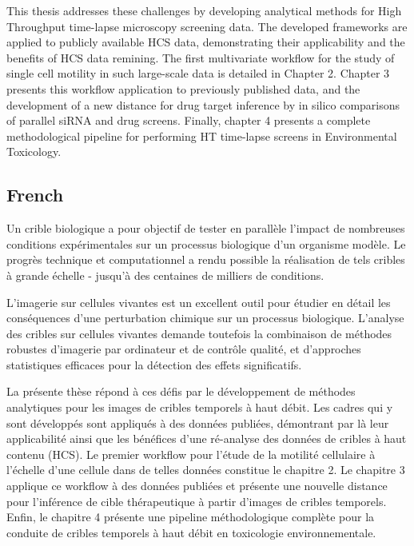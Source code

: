 \documentclass[12pt]{article}
\begin{document}
This thesis addresses these challenges by developing analytical methods for High Throughput time-lapse microscopy screening data. The developed frameworks are applied to publicly available HCS data, demonstrating their applicability and the benefits of HCS data remining. %
The first multivariate workflow for the study of single cell motility in such large-scale data is detailed in Chapter 2. Chapter 3 presents this workflow application to previously published data, and the development of a new distance for drug target inference by in silico comparisons of parallel siRNA and drug screens. Finally, chapter 4 presents a complete methodological pipeline for performing HT time-lapse screens in Environmental Toxicology.%
\subsection{French}
Un crible biologique a pour objectif de tester en parallèle l'impact de nombreuses conditions expérimentales sur un processus biologique d'un organisme modèle. Le progrès technique et computationnel a rendu possible la réalisation de tels cribles à grande échelle - jusqu'à des centaines de milliers de conditions.

L'imagerie sur cellules vivantes est un excellent outil pour étudier en détail les conséquences d'une perturbation chimique sur un processus biologique. L'analyse des cribles sur cellules vivantes demande toutefois la combinaison de méthodes robustes d'imagerie par ordinateur et de contr\^ole qualité, et d'approches statistiques efficaces pour la détection des effets significatifs.

La présente thèse répond à ces défis par le développement de méthodes analytiques pour les images de cribles temporels à haut débit. Les cadres qui y sont développés sont appliqués à des données publiées, démontrant par là leur applicabilité ainsi que les bénéfices d'une ré-analyse des données de cribles à haut contenu (HCS). Le premier workflow pour l'étude de la motilité cellulaire à l'échelle d'une cellule dans de telles données constitue le chapitre 2. Le chapitre 3 applique ce workflow à des données publiées et présente une nouvelle distance pour l'inférence de cible thérapeutique à partir d'images de cribles temporels. Enfin, le chapitre 4 présente une pipeline méthodologique complète pour la conduite de cribles temporels à haut débit en toxicologie environnementale.
\end{document}

